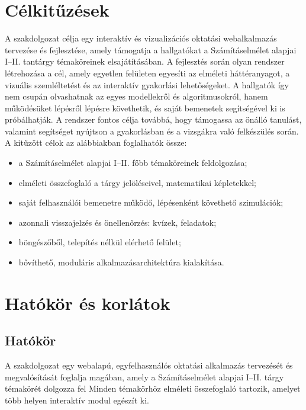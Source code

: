 \documentclass[12pt,a4paper]{report}
\begin{document}
\section{Célkitűzések}
A szakdolgozat célja egy interaktív és vizualizációs oktatási webalkalmazás
tervezése és fejlesztése, amely támogatja a hallgatókat a Számításelmélet
alapjai I--II. tantárgy témaköreinek elsajátításában.
A fejlesztés során olyan rendszer létrehozása a cél,
amely egyetlen felületen egyesíti az elméleti háttéranyagot, a vizuális
szemléltetést és az interaktív gyakorlási lehetőségeket. A hallgatók így
nem csupán olvashatnak az egyes modellekről és algoritmusokról, hanem
működésüket lépésről lépésre követhetik, és saját bemenetek segítségével
ki is próbálhatják.
A rendszer fontos célja továbbá, hogy támogassa az önálló tanulást,
valamint segítséget nyújtson a gyakorlásban és a vizsgákra való
felkészülés során.
A kitűzött célok az alábbiakban foglalhatók össze:

\begin{itemize}
    \item a Számításelmélet alapjai I--II. főbb témaköreinek feldolgozása;
    \item elméleti összefoglaló a tárgy jelöléseivel, matematikai képletekkel;
    \item saját felhasználói bemenetre működő, lépésenként követhető szimulációk;
    \item azonnali visszajelzés és önellenőrzés: kvízek, feladatok;
    \item böngészőből, telepítés nélkül elérhető felület;
    \item bővíthető, moduláris alkalmazásarchitektúra kialakítása.
\end{itemize}

\section{Hatókör és korlátok}

\subsection{Hatókör}

A szakdolgozat egy webalapú, egyfelhasználós oktatási alkalmazás
tervezését és megvalósítását foglalja magában, amely a Számításelmélet
alapjai I--II. tárgy témakörét dolgozza fel Minden témakörhöz elméleti összefoglaló
tartozik, amelyet több helyen interaktív modul egészít ki.
\end{document}

